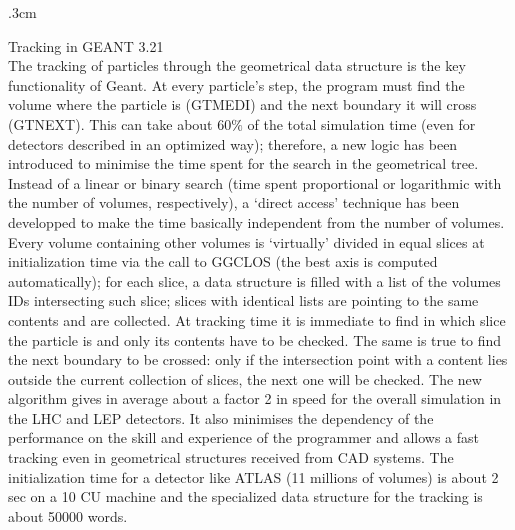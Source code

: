 \oddsidemargin -0.15cm
\evensidemargin -0.15cm
\topmargin .3cm
\textheight 21.5cm 

\rm

\pagestyle{empty}
\Large
Tracking in GEANT 3.21 \\[.7cm]
\large
\rm
The tracking of particles through the geometrical data structure is the key
functionality of Geant. At every particle's step, the program must find the
volume where the particle is (GTMEDI) and the next boundary it will cross
(GTNEXT). This can take
about $60\%$ of the total simulation time (even for detectors described
in an optimized way); therefore, a new logic has been introduced to minimise
the time spent for the search in the geometrical tree. Instead of a linear or
binary search (time spent proportional or logarithmic with the number of
volumes, respectively), a `direct access' technique has been developped to
make the time basically independent from the number of volumes. Every volume
containing other volumes is `virtually' divided in equal slices at 
initialization time via the call to GGCLOS
(the best axis is computed automatically); for each slice,
a data structure is filled with a list of the volumes IDs intersecting such
slice; slices with identical lists are pointing to the same contents
and are collected. At 
tracking time it is immediate to find in which slice the particle is and only
its contents have to be checked. The same is true to find the next boundary to
be crossed: only if the intersection point with a content lies outside the 
current collection of slices, the next one will be checked. The new algorithm
gives in average about a factor 2 in speed for the overall simulation in the
LHC and LEP detectors. It also minimises the dependency of the performance
on the skill and experience of the programmer and allows a fast tracking even
in geometrical structures received from CAD systems.
The initialization time for a detector like ATLAS
(11 millions of volumes) is about 2 sec on a 10 CU machine and the specialized
data structure for the tracking is about 50000 words.
 
















